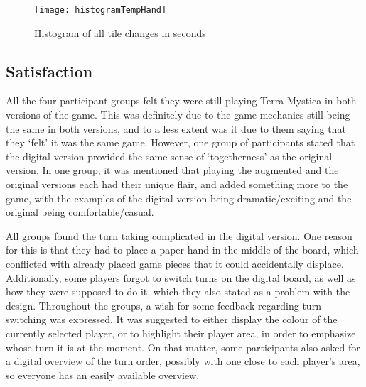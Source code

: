 \begin{figure}[h!]
	\centering
	\texttt{[image: histogramTempHand]}
	\caption{Histogram of all tile changes in seconds} 
	\label{fig:techHistogram}
\end{figure}

\subsection{Satisfaction}\label{satisfactionResult}
All the four participant groups felt they were still playing Terra Mystica in both versions of the game. This was definitely due to the game mechanics still being the same in both versions, and to a less extent was it due to them saying that they ‘felt’ it was the same game. However, one group of participants stated that the digital version provided the same sense of ‘togetherness’ as the original version. In one group, it was mentioned that playing the augmented and the original versions each had their unique flair, and added something more to the game, with the examples of the digital version being dramatic/exciting and the original being comfortable/casual. 

All groups found the turn taking complicated in the digital version. One reason for this is that they had to place a paper hand in the middle of the board, which conflicted with already placed game pieces that it could accidentally displace. Additionally, some players forgot to switch turns on the digital board, as well as how they were supposed to do it, which they also stated as a problem with the design. Throughout the groups, a wish for some feedback regarding turn switching was expressed. It was suggested to either display the colour of the currently selected player, or to highlight their player area, in order to emphasize whose turn it is at the moment. On that matter, some participants also asked for a digital overview of the turn order, possibly with one close to each player’s area, so everyone has an easily available overview. 

